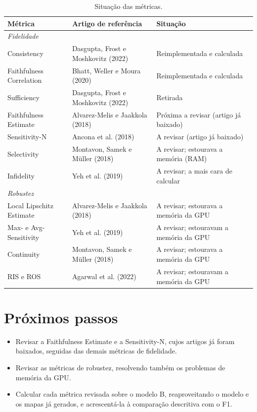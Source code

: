 \documentclass[11pt,a4paper]{article}
\begin{document}
\begin{table}[H]
\centering
\small
\caption{Situação das métricas.}
\begin{tabularx}{\textwidth}{lXl}
\toprule
\textbf{Métrica} & \textbf{Artigo de referência} & \textbf{Situação} \\
\midrule
\multicolumn{3}{l}{\textit{Fidelidade}} \\
Consistency & Dasgupta, Frost e Moshkovitz (2022) & Reimplementada e calculada \\
Faithfulness Correlation & Bhatt, Weller e Moura (2020) & Reimplementada e calculada \\
Sufficiency & Dasgupta, Frost e Moshkovitz (2022) & Retirada \\
Faithfulness Estimate & Alvarez-Melis e Jaakkola (2018) & Próxima a revisar (artigo já baixado) \\
Sensitivity-N & Ancona et al. (2018) & A revisar (artigo já baixado) \\
Selectivity & Montavon, Samek e Müller (2018) & A revisar; estourava a memória (RAM) \\
Infidelity & Yeh et al. (2019) & A revisar; a mais cara de calcular \\
\midrule
\multicolumn{3}{l}{\textit{Robustez}} \\
Local Lipschitz Estimate & Alvarez-Melis e Jaakkola (2018) & A revisar; estourava a memória da GPU \\
Max- e Avg-Sensitivity & Yeh et al. (2019) & A revisar; estouravam a memória da GPU \\
Continuity & Montavon, Samek e Müller (2018) & A revisar; estourava a memória da GPU \\
RIS e ROS & Agarwal et al. (2022) & A revisar; estouravam a memória da GPU \\
\bottomrule
\end{tabularx}
\end{table}

\section{Próximos passos}
\begin{itemize}
    \item Revisar a Faithfulness Estimate e a Sensitivity-N, cujos artigos já foram baixados, seguidas das demais métricas de fidelidade.
    \item Revisar as métricas de robustez, resolvendo também os problemas de memória da GPU.
    \item Calcular cada métrica revisada sobre o modelo B, reaproveitando o modelo e os mapas já gerados, e acrescentá-la à comparação descritiva com o F1.
\end{itemize}
\end{document}

